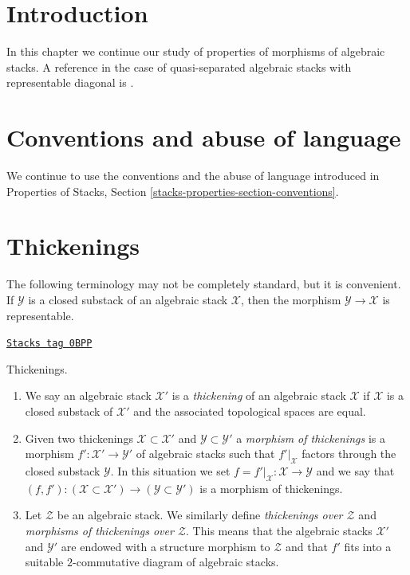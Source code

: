 \section{Introduction}
\label{stacks-more-morphisms-section-introduction}
In this chapter we continue our study of properties of morphisms of algebraic
stacks. A reference in the case of quasi-separated algebraic stacks with
representable diagonal is \cite{LM-B}.

\section{Conventions and abuse of language}
\label{stacks-more-morphisms-section-conventions}
We continue to use the conventions and the abuse of language
introduced in
Properties of Stacks, Section \ref{stacks-properties-section-conventions}.

\section{Thickenings}
\label{stacks-more-morphisms-section-thickenings}
The following terminology may not be completely standard, but it is convenient.
If $\mathcal{Y}$ is a closed substack of an algebraic stack $\mathcal{X}$,
then the morphism $\mathcal{Y} \to \mathcal{X}$ is representable.

\begin{definition}[Thickening]
\label{stacks-more-morphisms-definition-thickening}
\href{https://stacks.math.columbia.edu/tag/0BPP}{\texttt{Stacks tag 0BPP}}

Thickenings.
\begin{enumerate}
\item We say an algebraic stack $\mathcal{X}'$ is a {\it thickening}
of an algebraic stack $\mathcal{X}$ if $\mathcal{X}$ is a closed substack
of $\mathcal{X}'$ and the associated topological spaces are equal.
\item Given two thickenings $\mathcal{X} \subset \mathcal{X}'$ and
$\mathcal{Y} \subset \mathcal{Y}'$ a {\it morphism of thickenings}
is a morphism $f' : \mathcal{X}' \to \mathcal{Y}'$ of algebraic stacks
such that $f'|_\mathcal{X}$ factors through the closed
substack $\mathcal{Y}$. In this situation we set
$f = f'|_\mathcal{X} : \mathcal{X} \to \mathcal{Y}$ and we say that
$(f, f') : (\mathcal{X} \subset \mathcal{X}') \to
(\mathcal{Y} \subset \mathcal{Y}')$ is a morphism of thickenings.
\item Let $\mathcal{Z}$ be an algebraic stack. We similarly define
{\it thickenings over $\mathcal{Z}$} and
{\it morphisms of thickenings over $\mathcal{Z}$}.
This means that the algebraic stacks
$\mathcal{X}'$ and $\mathcal{Y}'$
are endowed with a structure
morphism to $\mathcal{Z}$ and that $f'$ fits into a suitable
$2$-commutative diagram of algebraic stacks.
\end{enumerate}
\end{definition}

